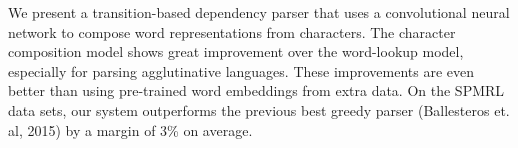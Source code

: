 We present a transition-based dependency parser that uses a convolutional neural network to compose word representations from characters. The character composition model shows great improvement over the word-lookup model, especially for parsing agglutinative languages. These improvements are even better than using pre-trained word embeddings from extra data. On the SPMRL data sets, our system outperforms the previous best greedy parser (Ballesteros et. al, 2015) by a margin of 3\% on average.
